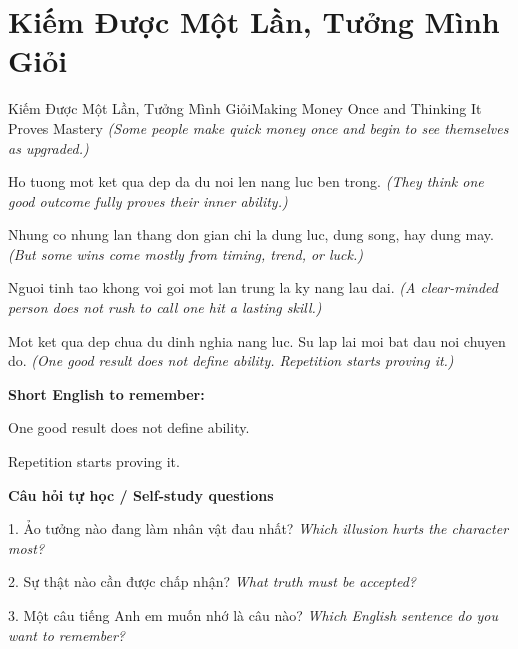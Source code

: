 \section{Kiếm Được Một Lần, Tưởng Mình Giỏi}
\begin{truyen}{Kiếm Được Một Lần, Tưởng Mình Giỏi}{Making Money Once and Thinking It Proves Mastery}
\textit{(Some people make quick money once and begin to see themselves as upgraded.)}

Ho tuong mot ket qua dep da du noi len nang luc ben trong.
\textit{(They think one good outcome fully proves their inner ability.)}

Nhung co nhung lan thang don gian chi la dung luc, dung song, hay dung may.
\textit{(But some wins come mostly from timing, trend, or luck.)}

Nguoi tinh tao khong voi goi mot lan trung la ky nang lau dai.
\textit{(A clear-minded person does not rush to call one hit a lasting skill.)}

\end{truyen}

\begin{baihoc}
Mot ket qua dep chua du dinh nghia nang luc. Su lap lai moi bat dau noi chuyen do.
\textit{(One good result does not define ability. Repetition starts proving it.)}
\end{baihoc}

\begin{ghinhoanh}
\textbf{Short English to remember:}

One good result does not define ability.

Repetition starts proving it.

\end{ghinhoanh}

\begin{tuhocnhanh}
\textbf{Câu hỏi tự học / Self-study questions}

1. Ảo tưởng nào đang làm nhân vật đau nhất? \textit{Which illusion hurts the character most?}

2. Sự thật nào cần được chấp nhận? \textit{What truth must be accepted?}

3. Một câu tiếng Anh em muốn nhớ là câu nào? \textit{Which English sentence do you want to remember?}
\end{tuhocnhanh}
\ngancach

